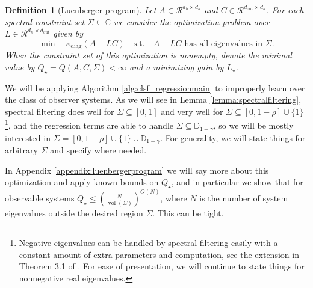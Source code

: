 \documentclass[11pt]{article}
\renewcommand{\subset}{\subseteq}
\def\R{{\mathcal R}}
\def\R{\ensuremath{\mathcal R}}
\newtheorem{definition}[theorem]{Definition}
\numberwithin{equation}{section}
\begin{document}
\begin{definition}[Luenberger program]
\label{def:luenbergerprogram}
    Let $A \in \R^{d_h \times d_h}$ and $C \in \R^{d_{\textrm{out}} \times d_h}$. For each spectral constraint set $\Sigma \subset \mathbb{C}$ we consider the optimization problem over $L \in \R^{d_h \times d_{\textrm{out}}}$ given by
    $$\min \quad \kappa_{\textrm{diag}}(A-LC) \quad \text{s.t.} \quad A-LC \text{ has all eigenvalues in $\Sigma$}.$$
    When the constraint set of this optimization is nonempty, denote the minimal value by $Q_\star = Q(A, C, \Sigma) < \infty$ and a minimizing gain by $L_\star$.
\end{definition}
We will be applying Algorithm \ref{alg:clsf_regressionmain} to improperly learn over the class of observer systems. As we will see in Lemma \ref{lemma:spectralfiltering}, spectral filtering does well for $\Sigma \subset [0, 1]$ and very well for $\Sigma \subset [0, 1-\rho] \cup \{1\}$\footnote{Negative eigenvalues can be handled by spectral filtering easily with a constant amount of extra parameters and computation, see the extension in Theorem 3.1 of \cite{agarwal2023spectral}. For ease of presentation, we will continue to state things for nonnegative real eigenvalues.}, and the regression terms are able to handle $\Sigma \subset \mathbb{D}_{1-\gamma}$, so we will be mostly interested in $\Sigma = [0, 1-\rho] \cup \{1\} \cup \mathbb{D}_{1-\gamma}$. For generality, we will state things for arbitrary $\Sigma$ and specify where needed.

In Appendix \ref{appendix:luenbergerprogram} we will say more about this optimization and apply known bounds on $Q_\star$, and in particular we show that for observable systems $Q_\star \leq (\frac{N}{\operatorname{vol}(\Sigma)})^{O(N)}$, where $N$ is the number of system eigenvalues outside the desired region $\Sigma$. This can be tight.
\end{document}
